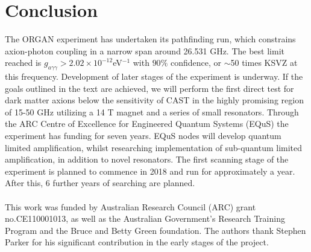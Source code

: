 \documentclass[preprint]{elsarticle}
\begin{document}
\section{Conclusion}
The ORGAN experiment has undertaken its pathfinding run, which constrains axion-photon coupling in a narrow span around 26.531 GHz. The best limit reached is $g_{a\gamma\gamma}>2.02\times 10^{-12} $eV$^{-1}$ with $90 \%$ confidence, or $\sim$50 times KSVZ at this frequency. Development of later stages of the experiment is underway.  If the goals outlined in the text are achieved, we will perform the first direct test for dark matter axions below the sensitivity of CAST in the highly promising region of 15-50 GHz utilizing a 14 T magnet and a series of small resonators. Through the ARC Centre of Excellence for Engineered Quantum Systems (EQuS) the experiment has funding for seven years. EQuS nodes will develop quantum limited amplification, whilst researching implementation of sub-quantum limited amplification, in addition to novel resonators. The first scanning stage of the experiment is planned to commence in 2018 and run for approximately a year. After this, 6 further years of searching are planned.\\
\\
This work was funded by Australian Research Council (ARC) grant no.CE110001013, as well as the Australian Government's Research Training Program and the Bruce and Betty Green foundation. The authors thank Stephen Parker for his significant contribution in the early stages of the project.

\end{document}

